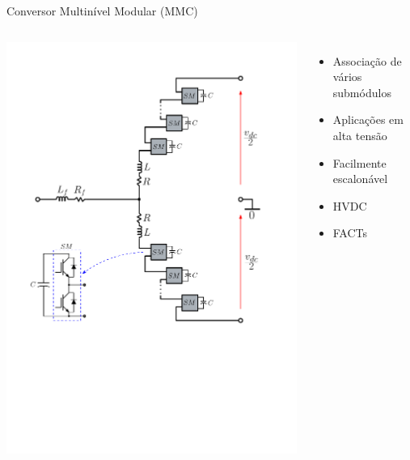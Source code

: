 \begin{frame}{Conversor Multinível Modular (MMC)}



\begin{columns}




\includegraphics[width=0.9\linewidth]{./figuras/introducao/MMC_blk_limpo}













\begin{itemize}
	\item Associação de vários submódulos \\[25pt]
	\item Aplicações em alta tensão \\[25pt]
	\item Facilmente escalonável \\[25pt]
	\item {\color{blue}HVDC} \\[25pt]
	\item {\color{blue}FACTs}
\end{itemize}




\end{columns}
\end{frame}

